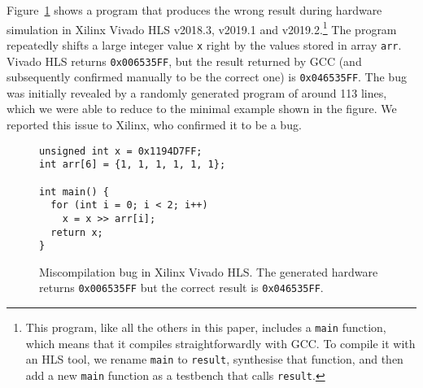 \begin{example}
\label{ex:vivado_miscomp}
Figure~\ref{fig:vivado_bug1} shows a program that produces the wrong result
during hardware simulation in Xilinx Vivado HLS v2018.3, v2019.1 and
v2019.2.\footnote{This program, like all the others in this paper, includes a
  \texttt{main} function, which means that it compiles straightforwardly with
  GCC. To compile it with an HLS tool, we rename \texttt{main} to
  \texttt{result}, synthesise that function, and then add a new \texttt{main}
  function as a testbench that calls \texttt{result}.} The program repeatedly
shifts a large integer value \texttt{x} right by the values stored in array
\texttt{arr}.  Vivado HLS returns \texttt{0x006535FF}, but the result returned
by GCC (and subsequently confirmed manually to be the correct one) is
\texttt{0x046535FF}. The bug was initially revealed by a randomly generated
program of around 113 lines, which we were able to reduce to the minimal example
shown in the figure.  We reported this issue to Xilinx, who confirmed it to be a
bug.
\end{example}

\begin{figure}
\centering
\begin{minipage}{6cm}
\begin{verbatim}
unsigned int x = 0x1194D7FF;
int arr[6] = {1, 1, 1, 1, 1, 1};

int main() {
  for (int i = 0; i < 2; i++)
    x = x >> arr[i];
  return x;
}
\end{verbatim}
\end{minipage}
\caption[Miscompilation bug in Xilinx Vivado HLS v2018.3, v2019.1 and
v2019.2. The generated hardware returns \texttt{0x006535FF} but the correct
result is \texttt{0x046535FF}.]{Miscompilation bug in Xilinx Vivado HLS. The
  generated hardware returns \texttt{0x006535FF} but the correct result is
  \texttt{0x046535FF}.}%
\label{fig:vivado_bug1}
\end{figure}

\def\totaltestcases{6700}
\def\totaltestcasefailures{1191}
\def\numuniquebugs{8}
\def\vivadotestcases{3645}

